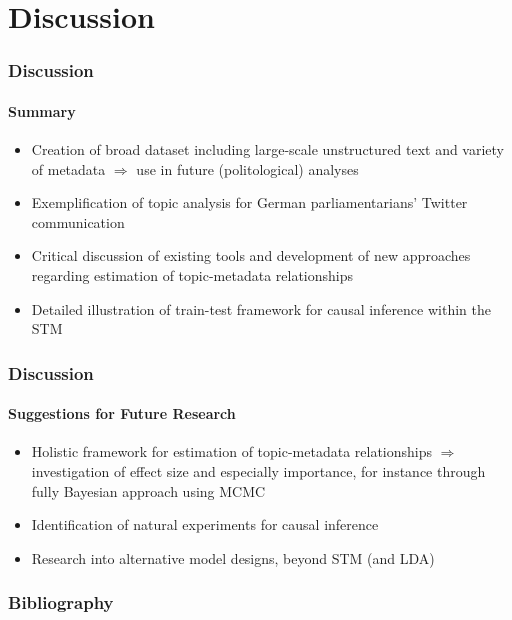 \documentclass[xcolor=dvipsnames]{beamer}
\begin{document}
\section{Discussion}
\begin{frame}
\frametitle{Discussion}
\framesubtitle{Summary}
\begin{itemize}
\item Creation of broad dataset including large-scale unstructured text and variety of metadata $\Rightarrow$ use in future (politological) analyses
\item Exemplification of topic analysis for German parliamentarians' Twitter communication
\item Critical discussion of existing tools and development of new approaches regarding estimation of topic-metadata relationships
\item Detailed illustration of train-test framework for causal inference within the STM
\end{itemize}
\end{frame}

\begin{frame}
\frametitle{Discussion}
\framesubtitle{Suggestions for Future Research}
\begin{itemize}
\item Holistic framework for estimation of topic-metadata relationships $\Rightarrow$ investigation of effect size and especially importance, for instance through fully Bayesian approach using MCMC
\item Identification of natural experiments for causal inference
\item Research into alternative model designs, beyond STM (and LDA)
\end{itemize}
\end{frame}

\begin{frame}[allowframebreaks]
\frametitle{Bibliography}
\printbibliography
\end{frame}
\end{document}
